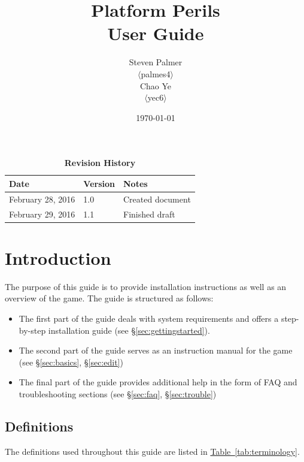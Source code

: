 \documentclass[12pt, titlepage]{article}
\begin{document}
\title{\bf Platform Perils\\[\baselineskip]\Large User Guide}
\author{Steven Palmer\\$\langle$palmes4$\rangle$\\Chao Ye\\$\langle$yec6$\rangle$}
\date{\today}
	
\maketitle

\tableofcontents
\listoftables
\listoffigures


\begin{table}[b]
\caption*{\bf Revision History}
\begin{tabularx}{\textwidth}{p{3.5cm}p{2cm}X}
\toprule {\bf Date} & {\bf Version} & {\bf Notes}\\
\midrule
February 28, 2016 & 1.0 & Created document\\
February 29, 2016 & 1.1 & Finished draft\\
\bottomrule
\end{tabularx}
\end{table}

\newpage


\section{Introduction}
The purpose of this guide is to provide installation instructions as well as an overview of the game.  The guide is structured as follows:

\begin{itemize}
  \item The first part of the guide deals with system requirements and offers a step-by-step installation guide (see \hyperref[sec:gettingstarted]{\S\ref*{sec:gettingstarted}}).
  \item The second part of the guide serves as an instruction manual for the game (see \hyperref[sec:basics]{\S\ref*{sec:basics}}, \hyperref[sec:edit]{\S\ref*{sec:edit}})
  \item The final part of the guide provides additional help in the form of FAQ and troubleshooting sections (see \hyperref[sec:faq]{\S\ref*{sec:faq}}, \hyperref[sec:trouble]{\S\ref*{sec:trouble}})
\end{itemize}

\subsection{Definitions}
The definitions used throughout this guide are listed in \hyperref[tab:terminology]{Table~\ref*{tab:terminology}}.
\end{document}
